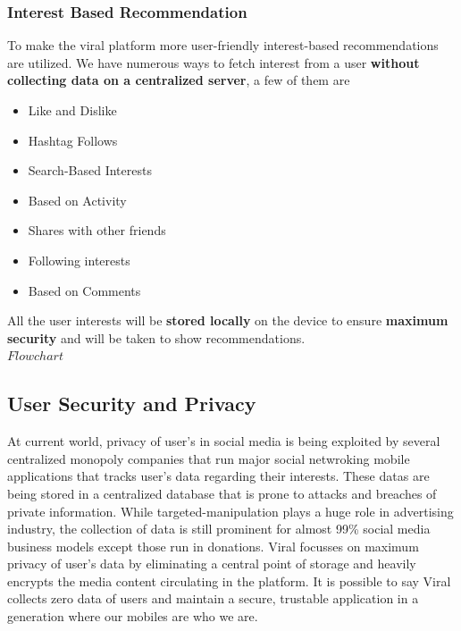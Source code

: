 \documentclass[10pt]{article}
\begin{document}
\subsubsection{Interest Based Recommendation}

To make the viral platform more user-friendly interest-based recommendations are utilized. We have numerous ways to fetch interest from a user \textbf{without collecting data on a centralized server}, a few of them are\\

\begin{itemize}[leftmargin=+0.2in]
\item Like and Dislike
\item Hashtag Follows
\item Search-Based Interests
\item Based on Activity
\item Shares with other friends
\item Following interests
\item Based on Comments
\end{itemize}

All the user interests will be \textbf{stored locally} on the device to ensure \textbf{maximum security} and will be taken to show recommendations.\\

$Flow chart$

\subsection{User Security and Privacy}

At current world, privacy of user's in social media is being exploited by several centralized monopoly companies that run major social netwroking mobile applications that tracks user's data regarding their interests. These datas are being stored in a centralized database that is prone to attacks and breaches of private information. While targeted-manipulation plays a huge role in advertising industry, the collection of data is still prominent for almost 99\% social media business models except those run in donations. Viral focusses on maximum privacy of user's data by eliminating a central point of storage and heavily encrypts the media content circulating in the platform. It is possible to say Viral collects zero data of users and maintain a secure, trustable application in a generation where our mobiles are who we are.\\
\end{document}
